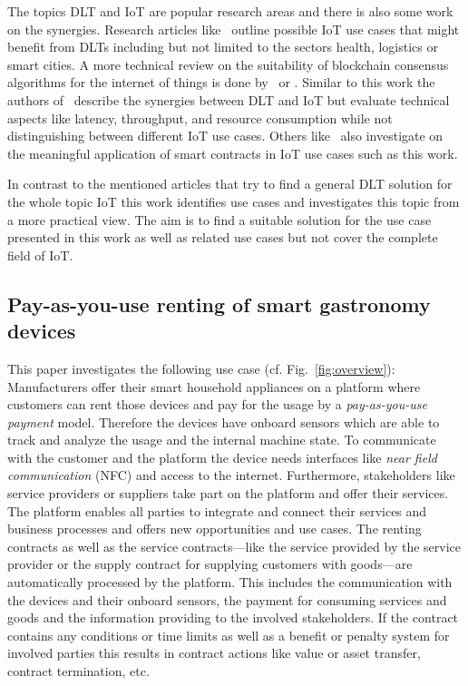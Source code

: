 \documentclass[conference]{IEEEtran}
\begin{document}
The topics DLT and IoT are popular research areas and there is also some work on the synergies. Research articles like~\cite{Review2018} outline possible IoT use cases that might benefit from DLTs including but not limited to the sectors health, logistics or smart cities. A more technical review on the suitability of blockchain consensus algorithms for the internet of things is done by~\cite{Salimitari2020} or \cite{Eval2018}. Similar to this work the authors of~\cite{convergence2019} describe the synergies between DLT and IoT but evaluate technical aspects like latency, throughput, and resource consumption while not distinguishing between different IoT use cases. Others like~\cite{SCIOT2016} also investigate on the meaningful application of smart contracts in IoT use cases such as this work.

In contrast to the mentioned articles that try to find a general DLT solution for the whole topic IoT this work identifies use cases and investigates this topic from a more practical view. The aim is to find a suitable solution for the use case presented in this work as well as related use cases but not cover the complete field of IoT.

%
\subsection{Pay-as-you-use renting of smart gastronomy devices}

This paper investigates the following use case (cf. Fig.~\ref{fig:overview}): Manufacturers offer their smart household appliances on a platform where customers can rent those devices and pay for the usage by a \emph{pay-as-you-use payment} model. Therefore the devices have onboard sensors which are able to track and analyze the usage and the internal machine state. To communicate with the customer and the platform the device needs interfaces like \emph{near field communication} (NFC) and access to the internet. Furthermore, stakeholders like service providers or suppliers take part on the platform and offer their services. The platform enables all parties to integrate and connect their services and business processes and offers new opportunities and use cases. The renting contracts as well as the service contracts---like the service provided by the service provider or the supply contract for supplying customers with goods---are automatically processed by the platform. This includes the communication with the devices and their onboard sensors, the payment for consuming services and goods and the information providing to the involved stakeholders. If the contract contains any conditions or time limits as well as a benefit or penalty system for involved parties this results in contract actions like value or asset transfer, contract termination, etc.
\end{document}
